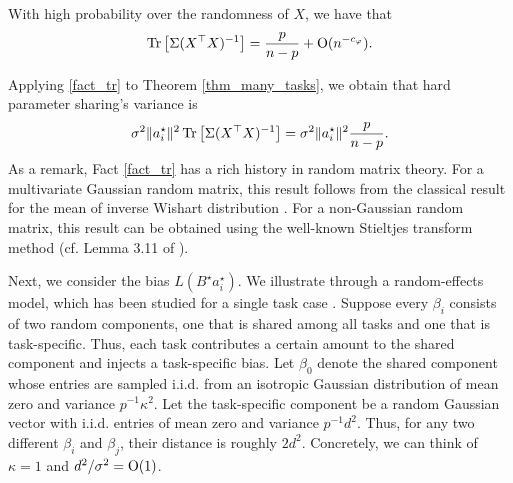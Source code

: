 \begin{fact}\label{fact_tr}
	With high probability over the randomness of $X$, we have that
		\[ \operatorname{Tr}\left[\Sigma (X^{\top} X)^{-1}\right] = \frac{p}{n - p} + \operatorname{O}(n^{-c_{\varphi}}). \]
\end{fact}
Applying \ref{fact_tr} to Theorem \ref{thm_many_tasks}, we obtain that hard parameter sharing's variance is
		\[ \sigma^2 \|a^{\star}_i\|^2 \operatorname{Tr}\left[\Sigma (X^{\top} X)^{-1}\right] = \sigma^2 \|a^{\star}_i\|^2 \frac{p}{n- p}. \]
As a remark, Fact \ref{fact_tr} has a rich history in random matrix theory.
For a multivariate Gaussian random matrix, this result follows from the classical result for the mean of inverse Wishart distribution \cite{anderson1958introduction}.
For a non-Gaussian random matrix, this result can be obtained using the well-known Stieltjes transform method (cf. Lemma 3.11 of \citet{bai2009spectral}).

Next, we consider the bias $L(B^{\star} a^{\star}_i)$.
We illustrate through a random-effects model, which has been studied for a single task case \cite{dobriban2020wonder}.
Suppose every $\beta_i$ consists of two random components, one that is shared among all tasks and one that is task-specific.
Thus, each task contributes a certain amount to the shared component and injects a task-specific bias.
Let $\beta_0$ denote the shared component whose entries are sampled i.i.d. from an isotropic Gaussian distribution of mean zero and variance $p^{-1}\kappa^2$.
Let the task-specific component be a random Gaussian vector with i.i.d. entries of mean zero and variance $p^{-1} d^2$.
Thus, for any two different $\beta_i$ and $\beta_j$, their distance is roughly $2d^2$.
Concretely, we can think of $\kappa = 1$ and $d^2/\sigma^2 = \operatorname{O}(1)$.

